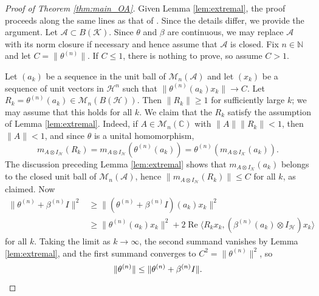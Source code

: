 \documentclass[12pt]{amsart}
\theoremstyle{definition}
\renewcommand{\Re}{\operatorname{Re}}
\newcommand{\A}{{\mathcal A}}
\renewcommand{\H}{{\mathcal H}}
\newcommand{\K}{{\mathcal K}}
\newcommand\matn{{\mathcal M}_n}
\begin{document}





\begin{proof}[Proof of Theorem \ref{thm:main_OA}]
  Given Lemma \ref{lem:extremal}, the proof proceeds along the same lines as that of \cite[Theorem 4.1]{COR23}.
  Since the details differ, we provide the argument. 
Let $\A \subset B(\K)$. Since $\theta$ and $\beta$ are continuous, we may replace $\mathcal{A}$ with its
norm closure if necessary and hence assume that $\mathcal{A}$ is closed.
Fix $n \in \mathbb{N}$ and let $C = \|\theta^{(n)}\|$.
  If $C \le 1$, there is nothing to prove, so assume $C > 1$.

  Let $(a_k)$ be a sequence in the unit ball of $\matn(\mathcal{A})$
  and let $(x_k)$ be a sequence of unit vectors in $\mathcal{H}^n$ such that $\|\theta^{(n)}(a_k) x_k\| \to C$.
  Let $R_k = \theta^{(n)}(a_k) \in \matn(B(\mathcal{H}))$.
  Then $\|R_k\| \ge 1$ for sufficiently large $k$; we may assume that this holds for all $k$.
  We claim that the $R_k$ satisfy
  the assumption of Lemma \ref{lem:extremal}. Indeed, if $A \in \matn(\mathbb{C})$ with $\|A\| \|R_k\| < 1$,
  then $\|A\| < 1$, and since $\theta$ is a unital homomorphism,
  \begin{equation*}
    m_{A \otimes I_{\H}}(R_k) = m_{A \otimes I_{\H}}(\theta^{(n)}(a_k)) = \theta^{(n)} (m_{A \otimes I_{\K}}(a_k)).
  \end{equation*}
  The discussion preceding Lemma \ref{lem:extremal} shows that $m_{A \otimes I_{\K}}(a_k)$ belongs to the closed unit ball of $\matn(\mathcal{A})$,
  hence $\|m_{A \otimes I_{\H}}(R_k)\| \le C$ for all $k$, as claimed.
  Now
  \begin{align*}
    \|\theta^{(n)} + \beta^{(n)} I \|^2
    &\ge \| (\theta^{(n)} + \beta^{(n)} I) (a_k) x_k\|^2 \\
    &\ge \|\theta^{(n)} (a_k) x_k\|^2 + 2 \Re \langle R_k x_k , (\beta^{(n)}(a_k) \otimes I_{\mathcal{H}} ) x_k \rangle 
  \end{align*}
  for all $k$. Taking the limit as $k \to \infty$, the second summand vanishes by Lemma \ref{lem:extremal}, and the first summand
  converges to $C^2 = \|\theta^{(n)}\|^2$, so
  \[
    \|\theta^{(n)}\| \le \|\theta^{(n)} + \beta^{(n)} I \|. \qedhere
  \]
\end{proof}




\end{document}
